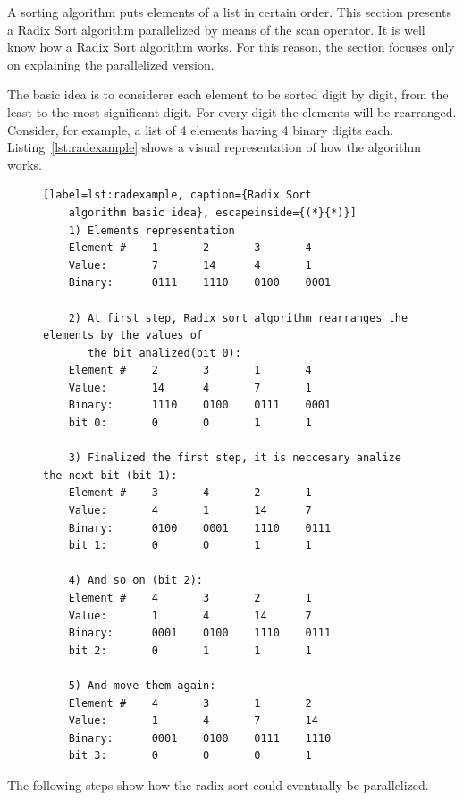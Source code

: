 \documentclass[Ingles]{ic-tese-v1}
\newcommand{\rlst}[1]{Listing~\ref{lst:#1}}
\begin{document}
A sorting algorithm puts elements of a list in certain order. This section
presents a Radix Sort algorithm parallelized by means of the scan operator. It is
well know how a Radix Sort algorithm works.  For this reason, the section
focuses only on explaining the parallelized version.

The basic idea is to considerer each element to be sorted digit by digit, from
the least to the most significant digit. For every digit the elements will be rearranged.
Consider, for example, a list of 4 elements having 4 binary digits each.
\rlst{radexample} shows a visual representation of how the
algorithm works.

\begin{figure}[t]
	\lstset{basicstyle=\scriptsize}
	\begin{lstlisting}[label=lst:radexample, caption={Radix Sort
	algorithm basic idea}, escapeinside={(*}{*)}]
	1) Elements representation
	Element #    1       2       3       4
	Value:       7       14      4       1
	Binary:      0111    1110    0100    0001

	2) At first step, Radix sort algorithm rearranges the elements by the values of
	   the bit analized(bit 0):
	Element #    2       3       1       4
	Value:       14      4       7       1
	Binary:      1110    0100    0111    0001
	bit 0:       0       0       1       1

	3) Finalized the first step, it is neccesary analize the next bit (bit 1):
	Element #    3       4       2       1
	Value:       4       1       14      7
	Binary:      0100    0001    1110    0111
	bit 1:       0       0       1       1

	4) And so on (bit 2):
	Element #    4       3       2       1
	Value:       1       4       14      7
	Binary:      0001    0100    1110    0111
	bit 2:       0       1       1       1

	5) And move them again:
	Element #    4       3       1       2
	Value:       1       4       7       14
	Binary:      0001    0100    0111    1110
	bit 3:       0       0       0       1

	\end{lstlisting}
\end{figure}

The following steps show how the radix sort could eventually be parallelized.
\end{document}
